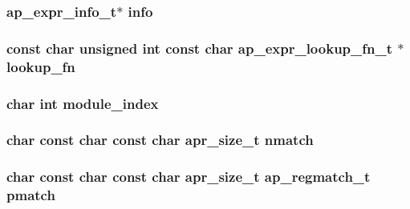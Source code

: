 \subsubsection[{\texorpdfstring{info}{info}}]{ {\bf ap\+\_\+expr\+\_\+info\+\_\+t}$\ast$ info}\hypertarget{group__AP__EXPR_gae5e165b68fbb12afc88707b8e6eb2f08}{}\label{group__AP__EXPR_gae5e165b68fbb12afc88707b8e6eb2f08}
\subsubsection[{\texorpdfstring{lookup\+\_\+fn}{lookup_fn}}]{\setlength{\rightskip}{0pt plus 5cm}const char unsigned {\bf int} const char {\bf ap\+\_\+expr\+\_\+lookup\+\_\+fn\+\_\+t} $\ast$ lookup\+\_\+fn}\hypertarget{group__AP__EXPR_ga93d947e1eae744a3ca2acd84e9133f45}{}\label{group__AP__EXPR_ga93d947e1eae744a3ca2acd84e9133f45}
\subsubsection[{\texorpdfstring{module\+\_\+index}{module_index}}]{\setlength{\rightskip}{0pt plus 5cm}char {\bf int} module\+\_\+index}\hypertarget{group__AP__EXPR_gaebe144cbe4474da9d8a21f71bee43251}{}\label{group__AP__EXPR_gaebe144cbe4474da9d8a21f71bee43251}
\subsubsection[{\texorpdfstring{nmatch}{nmatch}}]{\setlength{\rightskip}{0pt plus 5cm}char const char const char {\bf apr\+\_\+size\+\_\+t} nmatch}\hypertarget{group__AP__EXPR_ga92a43aa0352eb452970c83ba3da95a8f}{}\label{group__AP__EXPR_ga92a43aa0352eb452970c83ba3da95a8f}
\subsubsection[{\texorpdfstring{pmatch}{pmatch}}]{\setlength{\rightskip}{0pt plus 5cm}char const char const char {\bf apr\+\_\+size\+\_\+t} {\bf ap\+\_\+regmatch\+\_\+t} pmatch}\hypertarget{group__AP__EXPR_ga144e8a242b3028b194fd8f301b15078b}{}\label{group__AP__EXPR_ga144e8a242b3028b194fd8f301b15078b}
